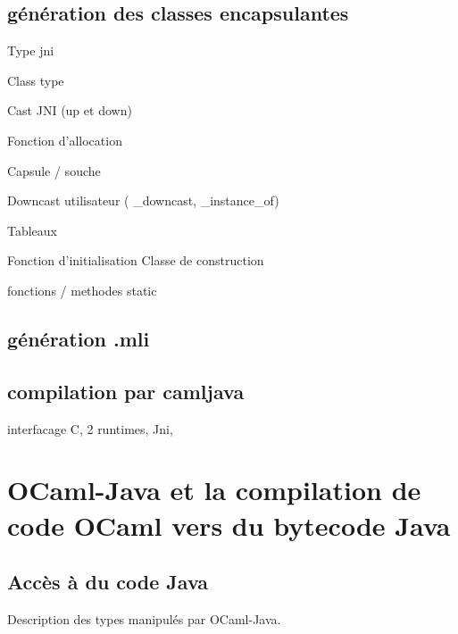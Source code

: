 \documentclass[a4paper, 11pt, notitlepage]{article}
\begin{document}
\subsection{génération des classes encapsulantes}

Type jni

Class type

Cast JNI (up et down)

Fonction d'allocation

Capsule / souche

Downcast utilisateur (
\_downcast,
\_instance\_of)

Tableaux

Fonction d'initialisation
Classe de construction

fonctions / methodes static

\subsection{génération .mli}



\subsection{compilation par camljava}
interfacage C, 2 runtimes, Jni, 







\newpage
\section{OCaml-Java et la compilation de code OCaml vers du bytecode Java}

\subsection{Accès à du code Java}
\noindent
Description des types manipulés par OCaml-Java.  
\end{document}
